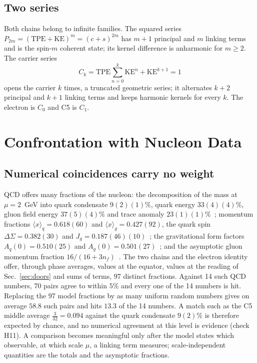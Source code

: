 \documentclass[%
 reprint, amsmath,amssymb, aps, prb, ]{revtex4-2}
\numberwithin{equation}{section}
\begin{document}
\subsection{Two series}

Both chains belong to infinite families. The squared series $P_{2m}=(\mathrm{TPE}+\mathrm{KE})^m=(c+s)^{2m}$ has $m+1$ principal and $m$ linking terms and is the spin-$m$ coherent state; its kernel difference is anharmonic for $m\ge2$. The carrier series
\begin{equation}
C_k=\mathrm{TPE}\sum_{n=0}^{k}\mathrm{KE}^n+\mathrm{KE}^{k+1}=1
\label{eq:Cseries}
\end{equation}
opens the carrier $k$ times, a truncated geometric series; it alternates $k+2$ principal and $k+1$ linking terms and keeps harmonic kernels for every $k$. The electron is $C_0$ and C5 is $C_1$.

\section{Confrontation with Nucleon Data}
\label{sec:confront}

\subsection{Numerical coincidences carry no weight}

QCD offers many fractions of the nucleon: the decomposition of the mass at $\mu=2$~GeV into quark condensate $9(2)(1)\%$, quark energy $33(4)(4)\%$, gluon field energy $37(5)(4)\%$ and trace anomaly $23(1)(1)\%$~\cite{ref:ji95,ref:chiqcd}; momentum fractions $\langle x\rangle_q=0.618(60)$ and $\langle x\rangle_g=0.427(92)$, the quark spin $\Delta\Sigma=0.382(30)$ and $J_g=0.187(46)(10)$~\cite{ref:etmc}; the gravitational form factors $A_q(0)=0.510(25)$ and $A_g(0)=0.501(27)$~\cite{ref:hps}; and the asymptotic gluon momentum fraction $16/(16+3n_f)$~\cite{ref:esw}. The two chains and the electron identity offer, through phase averages, values at the equator, values at the reading of Sec.~\ref{sec:doors} and sums of terms, 97 distinct fractions. Against 14 such QCD numbers, 70 pairs agree to within $5\%$ and every one of the 14 numbers is hit. Replacing the 97 model fractions by as many uniform random numbers gives on average $58.8$ such pairs and hits $13.3$ of the 14 numbers. A match such as the C5 middle average $\frac{3}{32}=0.094$ against the quark condensate $9(2)\%$ is therefore expected by chance, and no numerical agreement at this level is evidence (check H11). A comparison becomes meaningful only after the model states which observable, at which scale $\mu$, a linking term measures; scale-independent quantities are the totals and the asymptotic fractions.
\end{document}
